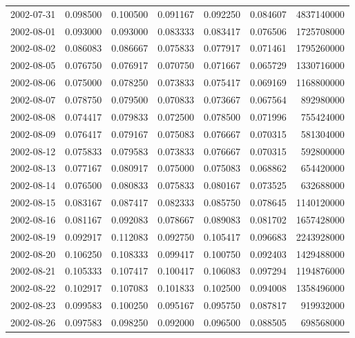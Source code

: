 \begin{tabular}{lrrrrrr}
2002-07-31 &    0.098500 &    0.100500 &    0.091167 &    0.092250 &    0.084607 &  4837140000 \\
2002-08-01 &    0.093000 &    0.093000 &    0.083333 &    0.083417 &    0.076506 &  1725708000 \\
2002-08-02 &    0.086083 &    0.086667 &    0.075833 &    0.077917 &    0.071461 &  1795260000 \\
2002-08-05 &    0.076750 &    0.076917 &    0.070750 &    0.071667 &    0.065729 &  1330716000 \\
2002-08-06 &    0.075000 &    0.078250 &    0.073833 &    0.075417 &    0.069169 &  1168800000 \\
2002-08-07 &    0.078750 &    0.079500 &    0.070833 &    0.073667 &    0.067564 &   892980000 \\
2002-08-08 &    0.074417 &    0.079833 &    0.072500 &    0.078500 &    0.071996 &   755424000 \\
2002-08-09 &    0.076417 &    0.079167 &    0.075083 &    0.076667 &    0.070315 &   581304000 \\
2002-08-12 &    0.075833 &    0.079583 &    0.073833 &    0.076667 &    0.070315 &   592800000 \\
2002-08-13 &    0.077167 &    0.080917 &    0.075000 &    0.075083 &    0.068862 &   654420000 \\
2002-08-14 &    0.076500 &    0.080833 &    0.075833 &    0.080167 &    0.073525 &   632688000 \\
2002-08-15 &    0.083167 &    0.087417 &    0.082333 &    0.085750 &    0.078645 &  1140120000 \\
2002-08-16 &    0.081167 &    0.092083 &    0.078667 &    0.089083 &    0.081702 &  1657428000 \\
2002-08-19 &    0.092917 &    0.112083 &    0.092750 &    0.105417 &    0.096683 &  2243928000 \\
2002-08-20 &    0.106250 &    0.108333 &    0.099417 &    0.100750 &    0.092403 &  1429488000 \\
2002-08-21 &    0.105333 &    0.107417 &    0.100417 &    0.106083 &    0.097294 &  1194876000 \\
2002-08-22 &    0.102917 &    0.107083 &    0.101833 &    0.102500 &    0.094008 &  1358496000 \\
2002-08-23 &    0.099583 &    0.100250 &    0.095167 &    0.095750 &    0.087817 &   919932000 \\
2002-08-26 &    0.097583 &    0.098250 &    0.092000 &    0.096500 &    0.088505 &   698568000 \\

\end{tabular}
